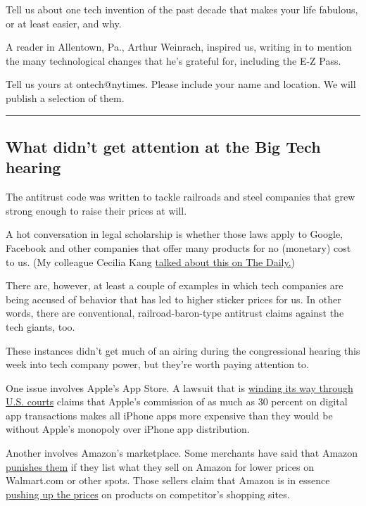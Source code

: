 Tell us about one tech invention of the past decade that makes your life
fabulous, or at least easier, and why.

A reader in Allentown, Pa., Arthur Weinrach, inspired us, writing in to
mention the many technological changes that he's grateful for, including
the E-Z Pass.

Tell us yours at ontech@nytimes. Please include your name and location.
We will publish a selection of them.

\begin{center}\rule{0.5\linewidth}{\linethickness}\end{center}

\hypertarget{what-didnt-get-attention-at-the-big-tech-hearing}{%
\subsection{What didn't get attention at the Big Tech
hearing}\label{what-didnt-get-attention-at-the-big-tech-hearing}}

The antitrust code was written to tackle railroads and steel companies
that grew strong enough to raise their prices at will.

A hot conversation in legal scholarship is whether those laws apply to
Google, Facebook and other companies that offer many products for no
(monetary) cost to us. (My colleague Cecilia Kang
\href{https://www.nytimes.com/2020/07/30/podcasts/the-daily/congress-facebook-amazon-google-apple.html}{talked
about this on The Daily.})

There are, however, at least a couple of examples in which tech
companies are being accused of behavior that has led to higher sticker
prices for us. In other words, there are conventional,
railroad-baron-type antitrust claims against the tech giants, too.

These instances didn't get much of an airing during the congressional
hearing this week into tech company power, but they're worth paying
attention to.

One issue involves Apple's App Store. A lawsuit that is
\href{https://www.nytimes.com/2019/05/13/us/politics/supreme-court-antitrust-apple.html}{winding
its way through U.S. courts} claims that Apple's commission of as much
as 30 percent on digital app transactions makes all iPhone apps more
expensive than they would be without Apple's monopoly over iPhone app
distribution.

Another involves Amazon's marketplace. Some merchants have said that
Amazon
\href{https://www.nytimes.com/2019/12/19/technology/amazon-sellers.html}{punishes
them} if they list what they sell on Amazon for lower prices on
Walmart.com or other spots. Those sellers claim that Amazon is in
essence
\href{https://www.bloomberg.com/news/articles/2019-08-05/amazon-is-squeezing-sellers-that-offer-better-prices-on-walmart}{pushing
up the prices} on products on competitor's shopping sites.

